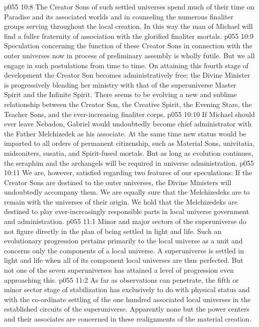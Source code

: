 \vs p055 10:8 The Creator Sons of such settled universes spend much of their time on Paradise and its associated worlds and in counseling the numerous finaliter groups serving throughout the local creation. In this way the man of Michael will find a fuller fraternity of association with the glorified finaliter mortals.
\pc \vs p055 10:9 Speculation concerning the function of these Creator Sons in connection with the outer universes now in process of preliminary assembly is wholly futile. But we all engage in such postulations from time to time. On attaining this fourth stage of development the Creator Son becomes administratively free; the Divine Minister is progressively blending her ministry with that of the superuniverse Master Spirit and the Infinite Spirit. There seems to be evolving a new and sublime relationship between the Creator Son, the Creative Spirit, the Evening Stars, the Teacher Sons, and the ever\hyp{}increasing finaliter corps.\plusone
\vs p055 10:10 If Michael should ever leave Nebadon, Gabriel would undoubtedly become chief administrator with the Father Melchizedek as his associate. At the same time new status would be imparted to all orders of permanent citizenship, such as Material Sons, univitatia, midsoniters, susatia, and Spirit\hyp{}fused mortals. But as long as evolution continues, the seraphim and the archangels will be required in universe administration.
\vs p055 10:11 We are, however, satisfied regarding two features of our speculations: If the Creator Sons are destined to the outer universes, the Divine Ministers will undoubtedly accompany them. We are equally sure that the Melchizedeks are to remain with the universes of their origin. We hold that the Melchizedeks are destined to play ever\hyp{}increasingly responsible parts in local universe government and administration.
\vs p055 11:1 Minor and major sectors of the superuniverse do not figure directly in the plan of being settled in light and life. Such an evolutionary progression pertains primarily to the local universe as a unit and concerns only the components of a local universe. A superuniverse is settled in light and life when all of its component local universes are thus perfected. But not one of the seven superuniverses has attained a level of progression even approaching this.
\pc \vs p055 11:2  As far as observations can penetrate, the fifth or minor sector stage of stabilization has exclusively to do with physical status and with the co\hyp{}ordinate settling of the one hundred associated local universes in the established circuits of the superuniverse. Apparently none but the power centers and their associates are concerned in these realignments of the material creation.
